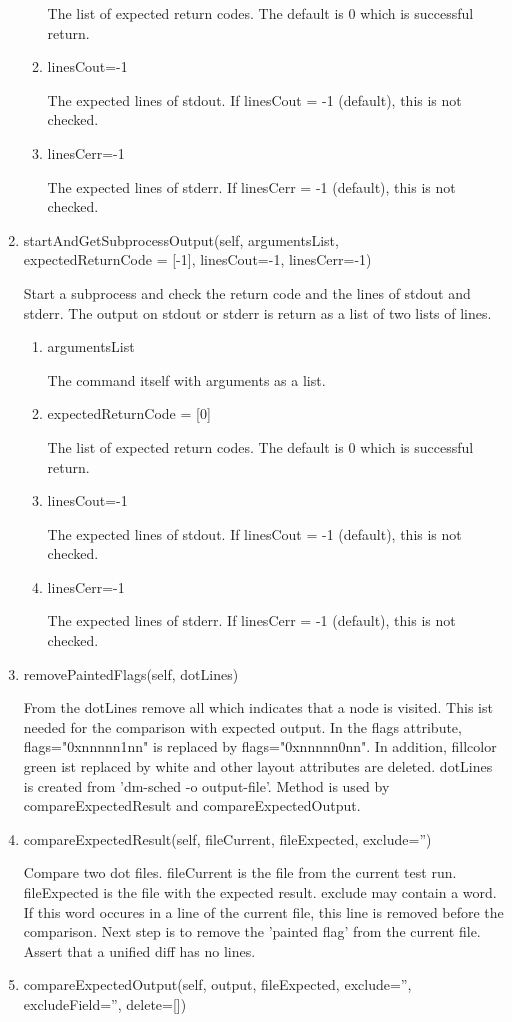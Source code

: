 \documentclass[12pt,a4paper]{report}
\begin{document}
\begin{enumerate}
\begin{enumerate}
The list of expected return codes. The default is 0 which is successful return.
\item linesCout=-1

The expected lines of stdout. If linesCout = -1 (default), this is not checked.
\item linesCerr=-1

The expected lines of stderr. If linesCerr = -1 (default), this is not checked.
\end{enumerate}
\item startAndGetSubprocessOutput(self, argumentsList, \\
expectedReturnCode = [-1], linesCout=-1, linesCerr=-1)

Start a subprocess and check the return code and the lines of stdout
and stderr. The output on stdout or stderr is return as a list of two
lists of lines.
\begin{enumerate}
\item argumentsList

The command itself with arguments as a list.
\item expectedReturnCode = [0]

The list of expected return codes. The default is 0 which is successful return.
\item linesCout=-1

The expected lines of stdout. If linesCout = -1 (default), this is not checked.
\item linesCerr=-1

The expected lines of stderr. If linesCerr = -1 (default), this is not checked.
\end{enumerate}
\item removePaintedFlags(self, dotLines)

From the dotLines remove all which indicates that a node is visited.
This ist needed for the comparison with expected output. In the flags
attribute, flags="0xnnnnn1nn" is replaced by flags="0xnnnnn0nn". In addition,
fillcolor green ist replaced by white and other layout attributes are
deleted. dotLines is created from 'dm-sched -o output-file'. Method
is used by compareExpectedResult and compareExpectedOutput.
\item compareExpectedResult(self, fileCurrent, fileExpected, exclude='')

Compare two dot files. fileCurrent is the file from the current test run.
fileExpected is the file with the expected result. exclude may contain
a word. If this word occures in a line of the current file, this line is
removed before the comparison. Next step is to remove the 'painted flag'
from the current file. Assert that a unified diff has no lines.
\item compareExpectedOutput(self, output, fileExpected, exclude='', \\
excludeField='', delete=[])


\end{enumerate}
\end{document}
